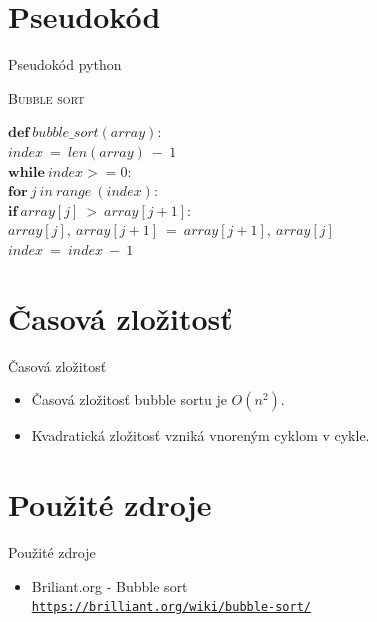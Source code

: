 \documentclass[10pt, hyperref={unicode}]{beamer}
\begin{document}
    \section{Pseudokód}
    \begin{frame}{Pseudokód python}
        
        \begin{algorithm}[H]
            
            \caption{\textsc{Bubble sort}}
            
            \SetNlSty{}{}{:}
        	\SetNlSkip{-0.6em}
        	
        	
        	\Indp
        	\BlankLine
        	$\textbf{def}\:bubble\_sort(array):$\\
        	\Indp    $index\:=\:len(array)\:-\:1$\\
        	    $\textbf{while}\: index >= 0:$\\
            \Indp    $ \textbf{for}\:j\:in\:range\:(index):$\\
        	\Indp           $\textbf{if}\:array[j]\:>\:array[j+1]:$\\
        	\Indp               $array[j],\:array[j+1]\:=\:array[j+1],\:array[j]$\\
        	\Indm \Indm        $index\:=\: index\: - \: 1$\\
        	\Indm    {}
        	    
    
	
	
        
    
        \end{algorithm}
    \end{frame}


    \section{Časová zložitosť}
    \begin{frame}{Časová zložitosť}
        \begin{itemize}
            \item Časová zložitosť bubble sortu je $O(n^2)$.
            \item Kvadratická zložitosť vzniká vnoreným cyklom v cykle.
        \end{itemize}
    \end{frame}
    
    \section{Použité zdroje}
    \begin{frame}{Použité zdroje}
        \begin{itemize}
            \item Briliant.org - Bubble sort \\
            \href{https://brilliant.org/wiki/bubble-sort/}{\small{\texttt{https://brilliant.org/wiki/bubble-sort/}}}
            
        \end{itemize}
    \end{frame}
\end{document}
